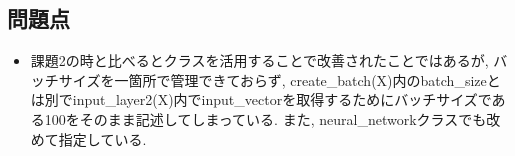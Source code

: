 \documentclass[a4j, titlepage]{jarticle}
\begin{document}
\subsection*{問題点}
    \begin{itemize}
        \item 課題2の時と比べるとクラスを活用することで改善されたことではあるが, バッチサイズを一箇所で管理できておらず, create\_batch(X)内のbatch\_sizeとは別でinput\_layer2(X)内でinput\_vectorを取得するためにバッチサイズである100をそのまま記述してしまっている. また, neural\_networkクラスでも改めて指定している.
    \end{itemize}
\end{document}
